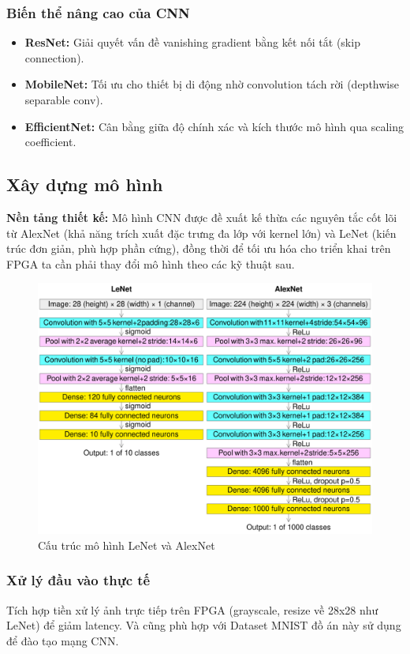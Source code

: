 \subsubsection{Biến thể nâng cao của CNN}
\begin{itemize}
    \item \textbf{ResNet:} Giải quyết vấn đề vanishing gradient bằng kết nối tắt (skip connection).
    \item \textbf{MobileNet:} Tối ưu cho thiết bị di động nhờ convolution tách rời (depthwise separable conv).
    \item \textbf{EfficientNet:} Cân bằng giữa độ chính xác và kích thước mô hình qua scaling coefficient.
\end{itemize}

\subsection{Xây dựng mô hình}
\textbf{Nền tảng thiết kế:} 
Mô hình CNN được đề xuất kế thừa các nguyên tắc cốt lõi từ AlexNet (khả năng trích xuất đặc trưng đa lớp với kernel lớn) và LeNet (kiến trúc đơn giản, phù hợp phần cứng), đồng thời để tối ưu hóa cho triển khai trên FPGA ta cần phải thay đổi mô hình theo các kỹ thuật sau.
\begin{figure}[H]
    \centering
    \includegraphics[width=0.75\linewidth]{Images/alexlenet.png}
    \caption{Cấu trúc mô hình LeNet và AlexNet}
    \label{fig:enter-label}
\end{figure}

\subsubsection{Xử lý đầu vào thực tế}
Tích hợp tiền xử lý ảnh trực tiếp trên FPGA (grayscale, resize về 28x28 như LeNet) để giảm latency. Và cũng phù hợp với Dataset MNIST đồ án này sử dụng để đào tạo mạng CNN.

